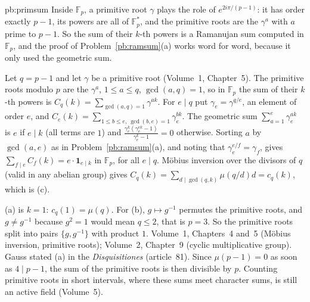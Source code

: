 \begin{solution}{pb:primsum}
\idea Inside $\mathbb F_p$, a primitive root $\gamma$ plays the role of $e^{2i\pi/(p-1)}$: it has order exactly $p-1$, its
powers are all of $\mathbb F_p^*$, and the primitive roots are the $\gamma^a$ with $a$ prime to $p-1$. So the sum of their
$k$-th powers is a Ramanujan sum computed in $\mathbb F_p$, and the proof of Problem~\ref{pb:ramsum}(a) works word for word,
because it only used the geometric sum.

\writeup Let $q=p-1$ and let $\gamma$ be a primitive root (Volume~1, Chapter~5). The primitive roots modulo $p$ are the
$\gamma^a$, $1\le a\le q$, $\gcd(a,q)=1$, so in $\mathbb F_p$ the sum of their $k$-th powers is
$C_q(k)=\sum_{\gcd(a,q)=1}\gamma^{ak}$. For $e\mid q$ put $\gamma_e=\gamma^{q/e}$, an element of order $e$, and
$C_e(k)=\sum_{1\le b\le e,\ \gcd(b,e)=1}\gamma_e^{bk}$. The geometric sum $\sum_{a=1}^e\gamma_e^{ak}$ is $e$ if $e\mid k$ (all
terms are $1$) and $\frac{\gamma_e^{k}(\gamma_e^{ek}-1)}{\gamma_e^k-1}=0$ otherwise. Sorting $a$ by $\gcd(a,e)$ as in
Problem~\ref{pb:ramsum}(a), and noting that $\gamma_e^{e/f}=\gamma_f$, gives $\sum_{f\mid e}C_f(k)=e\cdot\mathbf 1_{e\mid k}$ in
$\mathbb F_p$, for all $e\mid q$. Möbius inversion over the divisors of $q$ (valid in any abelian group) gives
$C_q(k)=\sum_{d\mid\gcd(q,k)}\mu(q/d)d=c_q(k)$, which is (c).

(a) is $k=1$: $c_q(1)=\mu(q)$. For (b), $g\mapsto g^{-1}$ permutes the primitive roots, and $g\ne g^{-1}$ because $g^2=1$
would mean $q\le2$, that is $p=3$. So the primitive roots split into pairs $\{g,g^{-1}\}$ with product $1$.
\tools Volume~1, Chapters~4 and~5 (Möbius inversion, primitive roots); Volume~2, Chapter~9 (cyclic multiplicative group).
\leads Gauss stated (a) in the \emph{Disquisitiones} (article~81). Since $\mu(p-1)=0$ as soon as $4\mid p-1$, the sum of the
primitive roots is then divisible by $p$. Counting primitive roots in short intervals, where these sums meet character sums,
is still an active field (Volume~5).
\end{solution}

